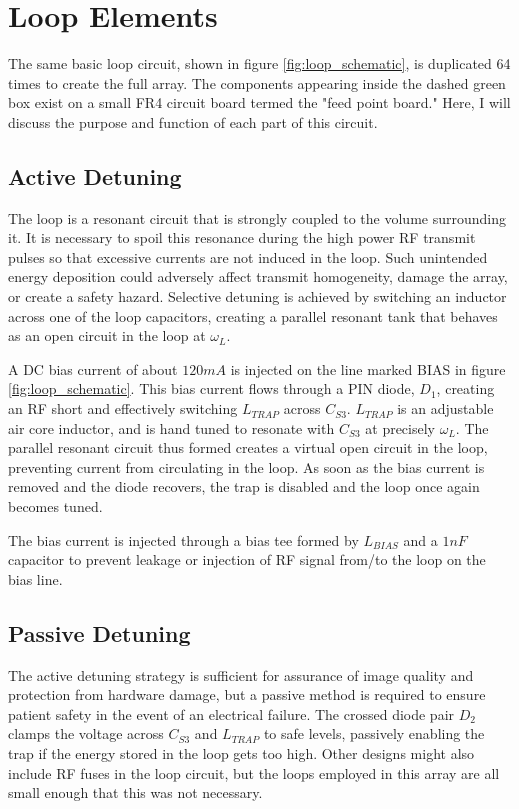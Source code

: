 \chapter{Loop Elements}

The same basic loop circuit, shown in figure \ref{fig:loop_schematic}, is duplicated 64 times to create the full array.
The components appearing inside the dashed green box exist on a small FR4 circuit board termed the "feed point board."
Here, I will discuss the purpose and function of each part of this circuit.

\section{Active Detuning}
The loop is a resonant circuit that is strongly coupled to the volume surrounding it. It is necessary to spoil this
resonance during the high power RF transmit pulses so that excessive currents are not induced in the loop. Such
unintended energy deposition could adversely affect transmit homogeneity, damage the array, or create a safety hazard.
Selective detuning is achieved by switching an inductor across one of the loop capacitors, creating a parallel
resonant tank that behaves as an open circuit in the loop at $\omega_L$.

A DC bias current of about $120mA$ is injected on the line marked BIAS in figure \ref{fig:loop_schematic}. This bias
current flows through a PIN diode, $D_1$, creating an RF short and effectively switching $L_{TRAP}$ across $C_{S3}$.
$L_{TRAP}$ is an adjustable air core inductor, and is hand tuned to resonate with $C_{S3}$ at precisely $\omega_L$. The
parallel resonant circuit thus formed creates a virtual open circuit in the loop, preventing current from circulating in
the loop. As soon as the bias current is removed and the diode recovers, the trap is disabled and the loop once again
becomes tuned.

The bias current is injected through a bias tee formed by $L_{BIAS}$ and a $1nF$ capacitor to prevent leakage or
injection of RF signal from/to the loop on the bias line.

\section{Passive Detuning}
The active detuning strategy is sufficient for assurance of image quality and protection from hardware damage, but a
passive method is required to ensure patient safety in the event of an electrical failure. The crossed diode pair $D_2$
clamps the voltage across $C_{S3}$ and $L_{TRAP}$ to safe levels, passively enabling the trap if the energy stored in
the loop gets too high. Other designs might also include RF fuses in the loop circuit, but the loops employed in this
array are all small enough that this was not necessary.

